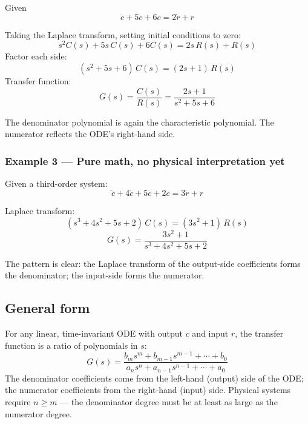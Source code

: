 \documentclass[../../book.tex]{subfiles}
\begin{document}
Given
\begin{equation}
  \ddot{c} + 5\dot{c} + 6c = 2\dot{r} + r
  \label{eq:ex2_ode}
\end{equation}

Taking the Laplace transform, setting initial conditions to zero:
\[
  s^2 C(s) + 5s\,C(s) + 6C(s) = 2s\,R(s) + R(s)
\]
Factor each side:
\[
  (s^2 + 5s + 6)\,C(s) = (2s + 1)\,R(s)
\]
Transfer function:
\begin{equation}
  G(s) = \frac{C(s)}{R(s)} = \frac{2s + 1}{s^2 + 5s + 6}
  \label{eq:ex2_tf}
\end{equation}

The denominator polynomial is again the characteristic polynomial.  The
numerator reflects the ODE's right-hand side.

\subsubsection*{Example 3 --- Pure math, no physical interpretation yet}

Given a third-order system:
\[
  \dddot{c} + 4\ddot{c} + 5\dot{c} + 2c = 3\ddot{r} + r
\]

Laplace transform:
\[
  (s^3 + 4s^2 + 5s + 2)\,C(s) = (3s^2 + 1)\,R(s)
\]
\begin{equation}
  G(s) = \frac{3s^2 + 1}{s^3 + 4s^2 + 5s + 2}
  \label{eq:ex3_tf}
\end{equation}

The pattern is clear: the Laplace transform of the output-side coefficients
forms the denominator; the input-side forms the numerator.

\subsection{General form}
\label{sec:tf_general}

For any linear, time-invariant ODE with output $c$ and input $r$, the
transfer function is a ratio of polynomials in $s$:
\begin{equation}
  G(s) = \frac{b_m s^m + b_{m-1}s^{m-1} + \cdots + b_0}
              {a_n s^n + a_{n-1}s^{n-1} + \cdots + a_0}
  \label{eq:tf_general}
\end{equation}
The denominator coefficients come from the left-hand (output) side of the ODE;
the numerator coefficients from the right-hand (input) side.  Physical systems
require $n \geq m$ --- the denominator degree must be at least as large as the
numerator degree.
\end{document}
